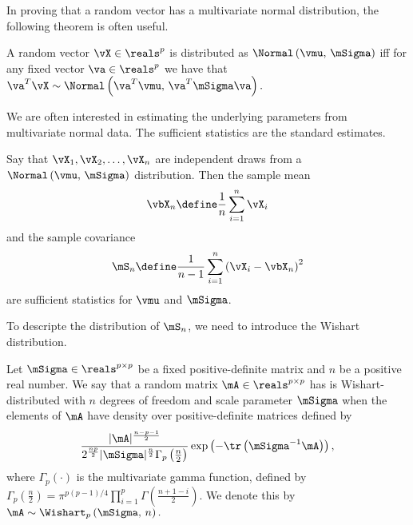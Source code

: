 \noindent
In proving that a random vector has a multivariate normal distribution,
the following theorem is often useful.

\begin{theorem}\label{T:cramer-wold}
A random vector
\(
    \vX \in \reals^p
\)
is distributed as 
\(
    \Normal \left(
        \vmu, \,
        \mSigma
    \right)
\)
iff for any fixed vector
\(
    \va \in \reals^p
\)
we have that
\(
    \va^T \vX
    \sim
    \Normal \left(
        \va^T \vmu, \,
        \va^T \mSigma \va
    \right).
\)
\end{theorem}

We are often interested in estimating the underlying parameters from
multivariate normal data.  The sufficient statistics are the standard
estimates.

\begin{proposition}\label{P:normal-sufficient-stats}
Say that
\(
    \vX_1, \vX_2, \ldots, \vX_n
\) 
are independent draws from a
\(
    \Normal \left(
        \vmu, \,
        \mSigma
    \right)
\)
distribution.  Then the sample mean
\begin{equation}\label{E:sample-mean}
    \vbX_n
    \define
    \frac{1}{n}
    \sum_{i=1}^n
        \vX_i
\end{equation}
and the sample covariance
\begin{equation}\label{E:sample-covariance}
    \mS_n
    \define
    \frac{1}{n-1}
    \sum_{i=1}^n
        \left(
            \vX_i - \vbX_n
        \right)^2
\end{equation}
are sufficient statistics for $\vmu$ and $\mSigma$.
\end{proposition}

To descripte the distribution of $\mS_n$, we need to introduce the 
Wishart distribution.

\begin{definition}\label{D:wishart}
Let 
\(
    \mSigma \in \reals^{p \times p}
\)
be a fixed positive-definite matrix and
\(
    n
\)
be a positive real number.  We say that a random matrix
\(
    \mA \in \reals^{p \times p}
\)
has is Wishart-distributed with 
\(
    n
\)
degrees of freedom and scale parameter
\(
    \mSigma
\) 
when the elements of
\(
    \mA
\) 
have density over positive-definite matrices defined by
\begin{equation}\label{E:wishart-density}
    \frac{ |\mA|^\frac{n-p-1}{2} }
         { 2^\frac{np}{2} 
           |\mSigma|^\frac{n}{2} 
           \Gamma_p \left( \frac{n}{2} \right) }
    \exp \left(
        -
        \tr \left(
            \mSigma^{-1} \mA
        \right)
    \right),
\end{equation}
where
\(
    \Gamma_p \left( \cdot \right)
\)
is the multivariate gamma function, defined by
\(
    \Gamma_p \left( \frac{n}{2} \right)
    =
    \pi^{p(p-1)/4}
    \prod_{i=1}^p
        \Gamma \left(
            \frac{n + 1 - i}{2}
        \right).
\)
We denote this by 
\(
    \mA
    \sim
    \Wishart_p \left(
        \mSigma, \,
        n
    \right).
\)
\end{definition}

